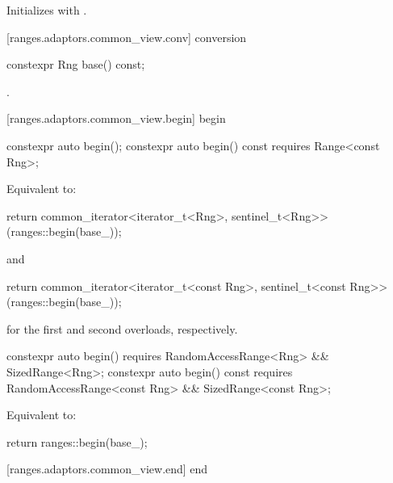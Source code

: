 \begin{itemdescr}
\pnum
\effects Initializes  with .
\end{itemdescr}

[ranges.adaptors.common_view.conv]{ conversion}

%
\begin{itemdecl}
constexpr Rng base() const;
\end{itemdecl}

\begin{itemdescr}
\pnum
\returns {}.
\end{itemdescr}

[ranges.adaptors.common_view.begin]{ begin}

%
\begin{itemdecl}
constexpr auto begin();
constexpr auto begin() const requires Range<const Rng>;
\end{itemdecl}

\begin{itemdescr}
\pnum
\effects Equivalent to:
\begin{codeblock}
return common_iterator<iterator_t<Rng>, sentinel_t<Rng>>(ranges::begin(base_));
\end{codeblock}
and
\begin{codeblock}
return common_iterator<iterator_t<const Rng>, sentinel_t<const Rng>>(ranges::begin(base_));
\end{codeblock}
for the first and second overloads, respectively.
\end{itemdescr}

%
\begin{itemdecl}
constexpr auto begin()
  requires RandomAccessRange<Rng> && SizedRange<Rng>;
constexpr auto begin() const
  requires RandomAccessRange<const Rng> && SizedRange<const Rng>;
\end{itemdecl}

\begin{itemdescr}
\pnum
\effects Equivalent to:
\begin{codeblock}
return ranges::begin(base_);
\end{codeblock}
\end{itemdescr}

[ranges.adaptors.common_view.end]{ end}

